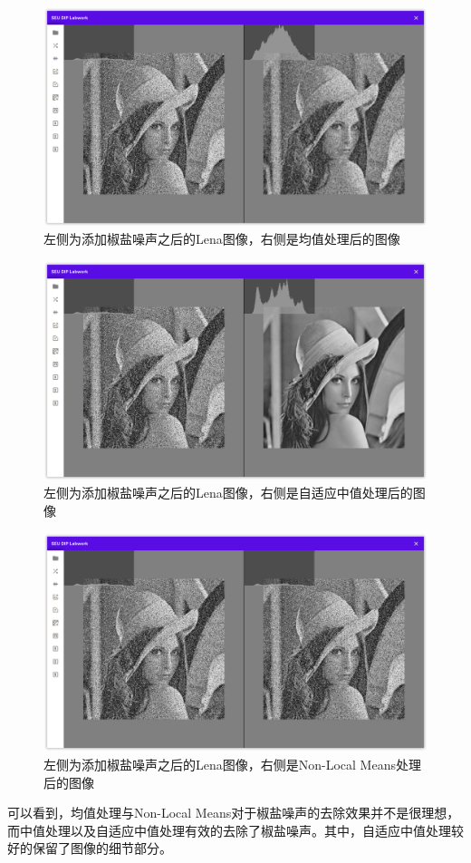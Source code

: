 \documentclass{article}
\begin{document}
\begin{figure}[H]
    \includegraphics[width=\textwidth]{img/saltpepper/lena-avg.png}
    \caption{左侧为添加椒盐噪声之后的Lena图像，右侧是均值处理后的图像}
\end{figure}

\begin{figure}[H]
    \includegraphics[width=\textwidth]{img/saltpepper/lena-adaptive.png}
    \caption{左侧为添加椒盐噪声之后的Lena图像，右侧是自适应中值处理后的图像}
\end{figure}

\begin{figure}[H]
    \includegraphics[width=\textwidth]{img/saltpepper/lena-nonlocal.png}
    \caption{左侧为添加椒盐噪声之后的Lena图像，右侧是Non-Local Means处理后的图像}
\end{figure}

可以看到，均值处理与Non-Local Means对于椒盐噪声的去除效果并不是很理想，而中值处理以及自适应中值处理有效的去除了椒盐噪声。其中，自适应中值处理较好的保留了图像的细节部分。
\end{document}
